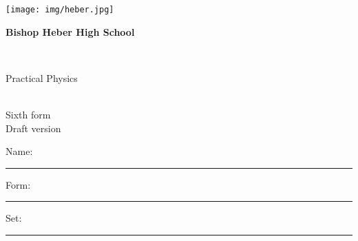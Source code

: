\documentclass[a4paper,12pt,twoside]{exam}
\begin{document}
\begin{titlepage}

\begin{minipage}{0.2\textwidth}
\texttt{[image: img/heber.jpg]}
\end{minipage}
\hspace{0.05\textwidth}
\begin{minipage}{0.7\textwidth}
\begin{Huge}\textcolor{heberblue}{\textbf{Bishop Heber High School}}\end{Huge}
\end{minipage}\\

\bfseries

\vspace{6em}

\begin{Huge}Practical Physics\end{Huge}\\
\indent \Large Sixth form\\

Draft version\\


\begin{minipage}{0.45\textwidth}
\hfill
\hfill	
\end{minipage}
\begin{minipage}{0.45\textwidth}
\end{minipage}
\begin{flushright}
\end{flushright}

\vfill

\begin{minipage}{0.5\textwidth}
Name:\\
\hrule
\vspace{0.5em} Form: \\
\hrule
\vspace{0.5em} Set: \\
\hrule
\end{minipage}

\thispagestyle{empty}
	
\end{titlepage}
\end{document}
